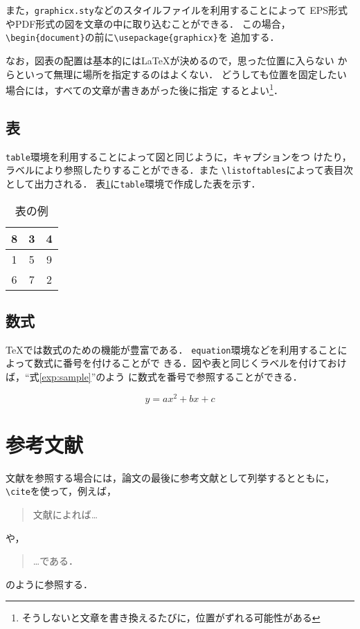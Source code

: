 \documentclass[11pt]{jreport}
\begin{document}
また，{\tt graphicx.sty}などのスタイルファイルを利用することによって
EPS形式やPDF形式の図を文章の中に取り込むことができる．
この場合，\verb|\begin{document}|の前に\verb|\usepackage{graphicx}|を
追加する．

なお，図表の配置は基本的には\LaTeX{}が決めるので，思った位置に入らない
からといって無理に場所を指定するのはよくない．
どうしても位置を固定したい場合には，すべての文章が書きあがった後に指定
するとよい\footnote{そうしないと文章を書き換えるたびに，位置がずれる可能性がある}．

\section{表}

{\tt table}環境を利用することによって図と同じように，キャプションをつ
けたり，ラベルにより参照したりすることができる．また
\verb|\listoftables|によって表目次として出力される．
表\ref{tab:sample}に{\tt table}環境で作成した表を示す．

\begin{table}
  \caption{表の例}
  \label{tab:sample}
  \centering
  \begin{tabular}{|c|c|c|}
    \hline
    8 & 3 & 4\\
    \hline
    1 & 5 & 9 \\
    \hline
    6 & 7 & 2 \\
    \hline
  \end{tabular}
\end{table}

\section{数式}

\TeX では数式のための機能が豊富である．
{\tt equation}環境などを利用することによって数式に番号を付けることがで
きる．図や表と同じくラベルを付けておけば，``式\ref{exp:sample}''のよう
に数式を番号で参照することができる．

\begin{equation}
  y = ax^2 + bx + c \label{exp:sample}
\end{equation}

\chapter{参考文献}

文献を参照する場合には，論文の最後に参考文献として列挙するとともに，
\verb|\cite|を使って，例えば，
\begin{quote}
  文献\cite{latex}によれば…
\end{quote}
や，
\begin{quote}
  …である\cite{latex2e}．
\end{quote}
のように参照する．
\end{document}
